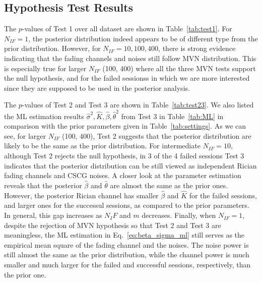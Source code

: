 \documentclass[journal,draftcls,onecolumn,12pt,twoside]{IEEEtran}
\begin{document}
\subsection{Hypothesis Test Results}
The $p$-values of Test 1 over all dataset are shown in Table~\ref{tab:test1}.
For $N_{IF} = 1$, the posterior distribution indeed appears to be of different
type from the prior distribution. However, for $N_{IF} = 10, 100, 400$, there is
strong evidence indicating that the fading channels and noises still follow MVN
distribution. This is especially true for larger $N_{IF}$ (100, 400) where all
the three MVN tests support the null hypothesis, and for the failed sessionss
in which we are more interested since they are supposed to be used in the
posterior analysis.

The $p$-values of Test 2 and Test 3 are shown in Table~\ref{tab:test23}. We
also listed the ML estimation results $\hat{\sigma}^2, \hat{K},
\hat{\beta}, \hat{\theta}^2$ from Test 3 in Table~\ref{tab:ML} in comparison
with the prior parameters given in Table~\ref{tab:settings}. As we can see, for larger $N_{IF}$
 (100, 400), Test 2 suggests that the posterior distribution are likely to be
the same as the prior distribution. For intermediate $N_{IF} = 10$, although
Test 2 rejects the null hypothesis, in 3 of the 4 failed sessions Test 3
indicates that the posterior distribution can be still viewed as independent Rician fading
channels and CSCG noises. A closer look at the parameter estimation reveals that 
the posterior $\hat{\beta}$ and $\hat{\theta}$ are almost the same as the prior
ones. However, the posterior Rician channel has smaller $\hat{\beta}$ and
$\hat{K}$ for the failed sessions, and larger ones for the successul sessions,
as compared to the prior parameters.
In general, this gap increases as $N_IF$ and $m$ decreases. Finally, when
$N_{IF} = 1$, despite the rejection of MVN hypothesis so that Test 2 and Test 3
are meaningless, the ML estimation in Eq.~\eqref{eq:beta_sigma_ml} still serves
as the empirical mean square of the fading channel and the noises. The noise
power is still almost the same as the prior distribution, while the channel
power is much smaller and much larger for the failed and successful
sessions, respectively, than the prior one.
\end{document}
